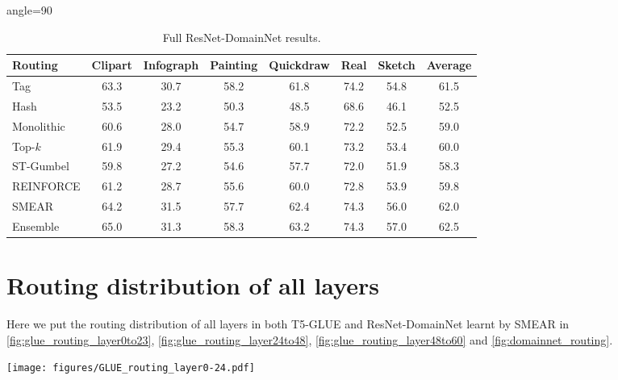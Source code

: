 \documentclass{article}
\theoremstyle{plain}
\theoremstyle{definition}
\theoremstyle{remark}
\begin{document}
\begin{table}
    \centering
\begin{adjustbox}{angle=90}
\begin{tabular}{l c c c c c c c}
  \toprule
  Routing & Clipart & Infograph & Painting & Quickdraw & Real & Sketch & Average \\
  \midrule
  Tag & 63.3 & 30.7 & 58.2 & 61.8 & 74.2 & 54.8 & 61.5 \\
  Hash & 53.5 & 23.2 & 50.3 & 48.5 & 68.6 & 46.1 & 52.5 \\
  Monolithic & 60.6 & 28.0 & 54.7 & 58.9 & 72.2 & 52.5 & 59.0 \\
  Top-$k$ & 61.9 & 29.4 & 55.3 & 60.1 & 73.2 & 53.4 & 60.0 \\
  ST-Gumbel & 59.8 & 27.2 & 54.6 & 57.7 & 72.0 & 51.9 & 58.3 \\
  REINFORCE & 61.2 & 28.7 & 55.6 & 60.0 & 72.8 & 53.9 & 59.8\\
  SMEAR & 64.2 & 31.5 & 57.7 & 62.4 & 74.3 & 56.0 & 62.0 \\
  Ensemble & 65.0 & 31.3 & 58.3 & 63.2 & 74.3 & 57.0 & 62.5 \\
  \bottomrule
\end{tabular}
\end{adjustbox}
    \caption{Full ResNet-DomainNet results.}
    \label{tab:domainnet_results}
\end{table}

\section{Routing distribution of all layers}
\label{sec:router_dist_all_layers}
Here we put the routing distribution of all layers in both T5-GLUE and ResNet-DomainNet learnt by SMEAR in \cref{fig:glue_routing_layer0to23}, \cref{fig:glue_routing_layer24to48}, \cref{fig:glue_routing_layer48to60} and \cref{fig:domainnet_routing}. 

\begin{figure*}[htp]
 
    \centering
    \texttt{[image: figures/GLUE\_routing\_layer0-24.pdf]}
    \caption{Routing distribution learnt by SMEAR in encoder routing blocks (0-23) of T5-GLUE}
    \label{fig:glue_routing_layer0to23}    

\end{figure*}
\end{document}
